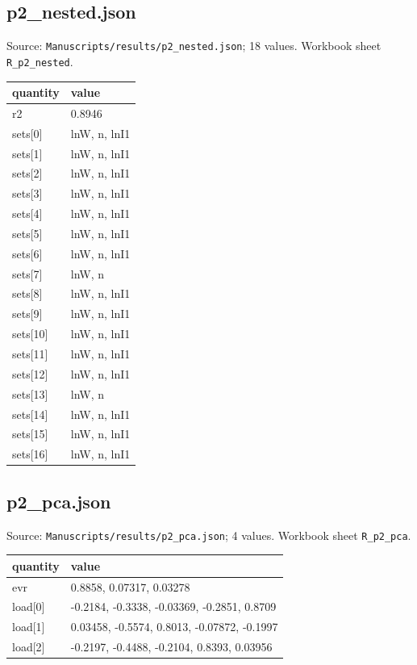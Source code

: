 \subsection*{p2\_nested.json}
\noindent\small Source: \nolinkurl{Manuscripts/results/p2_nested.json}; 18 values. Workbook sheet \texttt{R\_p2\_nested}.\par
{\scriptsize\begin{longtable}{p{}p{}}\toprule\textbf{quantity} & \textbf{value}\\\midrule\endhead
{}r2 & 0.8946\\
{}sets[0] & lnW, n, lnI1\\
{}sets[1] & lnW, n, lnI1\\
{}sets[2] & lnW, n, lnI1\\
{}sets[3] & lnW, n, lnI1\\
{}sets[4] & lnW, n, lnI1\\
{}sets[5] & lnW, n, lnI1\\
{}sets[6] & lnW, n, lnI1\\
{}sets[7] & lnW, n\\
{}sets[8] & lnW, n, lnI1\\
{}sets[9] & lnW, n, lnI1\\
{}sets[10] & lnW, n, lnI1\\
{}sets[11] & lnW, n, lnI1\\
{}sets[12] & lnW, n, lnI1\\
{}sets[13] & lnW, n\\
{}sets[14] & lnW, n, lnI1\\
{}sets[15] & lnW, n, lnI1\\
{}sets[16] & lnW, n, lnI1\\
\bottomrule\end{longtable}}

\subsection*{p2\_pca.json}
\noindent\small Source: \nolinkurl{Manuscripts/results/p2_pca.json}; 4 values. Workbook sheet \texttt{R\_p2\_pca}.\par
{\scriptsize\begin{longtable}{p{}p{}}\toprule\textbf{quantity} & \textbf{value}\\\midrule\endhead
{}evr & 0.8858, 0.07317, 0.03278\\
{}load[0] & -0.2184, -0.3338, -0.03369, -0.2851, 0.8709\\
{}load[1] & 0.03458, -0.5574, 0.8013, -0.07872, -0.1997\\
{}load[2] & -0.2197, -0.4488, -0.2104, 0.8393, 0.03956\\
\bottomrule\end{longtable}}


